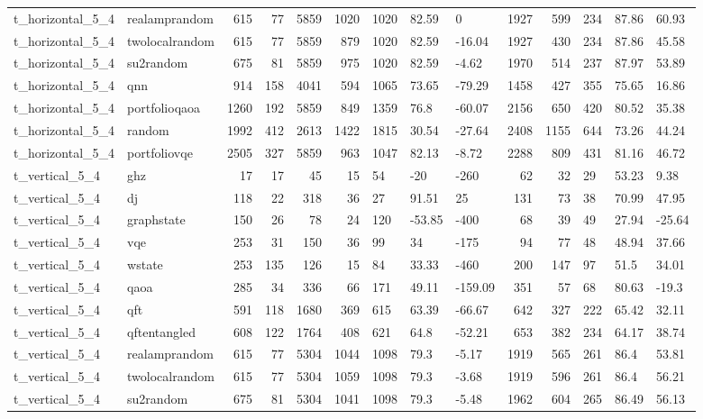 \begin{longtable}{llrrrrlllrrlll}
t\_horizontal\_5\_4 & realamprandom & 615 & 77 & 5859 & 1020 & 1020 & 82.59 & 0 & 1927 & 599 & 234 & 87.86 & 60.93 \\
t\_horizontal\_5\_4 & twolocalrandom & 615 & 77 & 5859 & 879 & 1020 & 82.59 & -16.04 & 1927 & 430 & 234 & 87.86 & 45.58 \\
t\_horizontal\_5\_4 & su2random & 675 & 81 & 5859 & 975 & 1020 & 82.59 & -4.62 & 1970 & 514 & 237 & 87.97 & 53.89 \\
t\_horizontal\_5\_4 & qnn & 914 & 158 & 4041 & 594 & 1065 & 73.65 & -79.29 & 1458 & 427 & 355 & 75.65 & 16.86 \\
t\_horizontal\_5\_4 & portfolioqaoa & 1260 & 192 & 5859 & 849 & 1359 & 76.8 & -60.07 & 2156 & 650 & 420 & 80.52 & 35.38 \\
t\_horizontal\_5\_4 & random & 1992 & 412 & 2613 & 1422 & 1815 & 30.54 & -27.64 & 2408 & 1155 & 644 & 73.26 & 44.24 \\
t\_horizontal\_5\_4 & portfoliovqe & 2505 & 327 & 5859 & 963 & 1047 & 82.13 & -8.72 & 2288 & 809 & 431 & 81.16 & 46.72 \\
t\_vertical\_5\_4 & ghz & 17 & 17 & 45 & 15 & 54 & -20 & -260 & 62 & 32 & 29 & 53.23 & 9.38 \\
t\_vertical\_5\_4 & dj & 118 & 22 & 318 & 36 & 27 & 91.51 & 25 & 131 & 73 & 38 & 70.99 & 47.95 \\
t\_vertical\_5\_4 & graphstate & 150 & 26 & 78 & 24 & 120 & -53.85 & -400 & 68 & 39 & 49 & 27.94 & -25.64 \\
t\_vertical\_5\_4 & vqe & 253 & 31 & 150 & 36 & 99 & 34 & -175 & 94 & 77 & 48 & 48.94 & 37.66 \\
t\_vertical\_5\_4 & wstate & 253 & 135 & 126 & 15 & 84 & 33.33 & -460 & 200 & 147 & 97 & 51.5 & 34.01 \\
t\_vertical\_5\_4 & qaoa & 285 & 34 & 336 & 66 & 171 & 49.11 & -159.09 & 351 & 57 & 68 & 80.63 & -19.3 \\
t\_vertical\_5\_4 & qft & 591 & 118 & 1680 & 369 & 615 & 63.39 & -66.67 & 642 & 327 & 222 & 65.42 & 32.11 \\
t\_vertical\_5\_4 & qftentangled & 608 & 122 & 1764 & 408 & 621 & 64.8 & -52.21 & 653 & 382 & 234 & 64.17 & 38.74 \\
t\_vertical\_5\_4 & realamprandom & 615 & 77 & 5304 & 1044 & 1098 & 79.3 & -5.17 & 1919 & 565 & 261 & 86.4 & 53.81 \\
t\_vertical\_5\_4 & twolocalrandom & 615 & 77 & 5304 & 1059 & 1098 & 79.3 & -3.68 & 1919 & 596 & 261 & 86.4 & 56.21 \\
t\_vertical\_5\_4 & su2random & 675 & 81 & 5304 & 1041 & 1098 & 79.3 & -5.48 & 1962 & 604 & 265 & 86.49 & 56.13 \\

\end{longtable}
